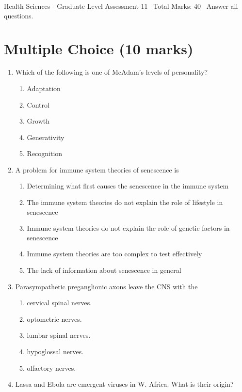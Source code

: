 \documentclass[12pt]{article}
\begin{document}
\begin{center}
Health Sciences - Graduate Level Assessment 11 \
Total Marks: 40 \
Answer all questions.
\end{center}

\section*{Multiple Choice (10 marks)}
\begin{enumerate}[label=\arabic*.]
\item Which of the following is one of McAdam's levels of personality?
\begin{enumerate}[label=(\alph*)]
    \item Adaptation
    \item Control
    \item Growth
    \item Generativity
    \item Recognition
\end{enumerate}
\item A problem for immune system theories of senescence is
\begin{enumerate}[label=(\alph*)]
    \item Determining what first causes the senescence in the immune system
    \item The immune system theories do not explain the role of lifestyle in senescence
    \item Immune system theories do not explain the role of genetic factors in senescence
    \item Immune system theories are too complex to test effectively
    \item The lack of information about senescence in general
\end{enumerate}
\item Parasympathetic preganglionic axons leave the CNS with the
\begin{enumerate}[label=(\alph*)]
    \item cervical spinal nerves.
    \item optometric nerves.
    \item lumbar spinal nerves.
    \item hypoglossal nerves.
    \item olfactory nerves.
\end{enumerate}
\item Lassa and Ebola are emergent viruses in W. Africa. What is their origin?
\begin{enumerate}[label=(\alph*)]

\end{enumerate}
\end{enumerate}
\end{document}
